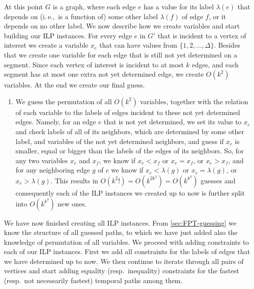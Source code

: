 \documentclass[a4paper,UKenglish,cleveref, autoref, thm-restate]{lipics-v2021}
\newcommand{\ie}{i.\,e.,\ }
\newcounter{guesscounter}
\begin{document}
At this point $G$ is a graph, where each edge $e$ has a value for its label $\lambda(e)$
that depends on (\ie is a function of) some other label $\lambda(f)$ of edge $f$,
or it depends on no other label.
We now describe how we create variables and start building our ILP instances. 
For every edge $e$ in $G'$ that is incident to a vertex of interest we create a variable $x_e$ that can have values from $ \{1, 2, \dots, \Delta\}$.
Besides that we create one variable for each edge that is still not yet determined on a segment.
Since each vertex of interest is incident to at most $k$ edges, and each segment has at most one extra not yet determined edge, we create $O(k^2)$ variables.
At the end we create our final guess.
\begin{enumerate}[G-1.]
\setcounter{enumi}{\value{guesscounter}}
    \item \label{FPT:guessallPermutations}
We guess the permutation of all $O(k^2)$ variables,
together with the relation of each variable to the labels of edges incident to these not yet determined edges.
Namely, for an edge $e$ that is not yet determined, we set its value to $x_e$ and check labels of all of its neighbors,
which are determined by some other label,
and variables of the not yet determined neighbors,
and guess if $x_e$ is smaller, equal or bigger than the labels of the edges of its neighbors.
So, for any two variables $x_e$ and $x_f$, we know if $x_e < x_f$ or $x_e = x_f$, or $x_e > x_f$,
and for any neighboring edge $g$ of $e$ we know if $x_e < \lambda(g)$ or 
$x_e = \lambda(g)$, or $x_e > \lambda(g)$.
This results in $O(k^2 !) = O(k^{2k^2}) = O(k^{k^3})$ guesses
and consequently
each of the ILP instances we created up to now is further split into $O(k^{k^3})$ new ones.
\end{enumerate}
We have now finished creating all ILP instances.
From \cref{sec:FPT-guessing} we know the structure of all guessed paths, to which we have just added also the knowledge of permutation of all variables.
We proceed with adding constraints to each of our ILP instances.
First we add all constraints for the labels of edges that we have determined up to now.
We then continue to iterate through all pairs of vertices and start adding equality (resp.~inequality) constraints for the fastest (resp.~not necessarily fastest) temporal paths among them.
\end{document}
